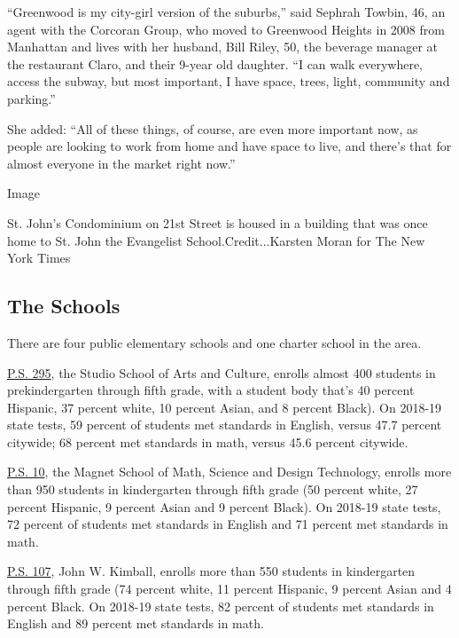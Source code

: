 ``Greenwood is my city-girl version of the suburbs,'' said Sephrah
Towbin, 46, an agent with the Corcoran Group, who moved to Greenwood
Heights in 2008 from Manhattan and lives with her husband, Bill Riley,
50, the beverage manager at the restaurant Claro, and their 9-year old
daughter. ``I can walk everywhere, access the subway, but most
important, I have space, trees, light, community and parking.''

She added: ``All of these things, of course, are even more important
now, as people are looking to work from home and have space to live, and
there's that for almost everyone in the market right now.''

Image

St. John's Condominium on 21st Street is housed in a building that was
once home to St. John the Evangelist School.Credit...Karsten Moran for
The New York Times

\hypertarget{the-schools}{%
\subsection{The Schools}\label{the-schools}}

There are four public elementary schools and one charter school in the
area.

\href{https://tools.nycenet.edu/snapshot/2019/15K295/EMS/}{P.S. 295},
the Studio School of Arts and Culture, enrolls almost 400 students in
prekindergarten through fifth grade, with a student body that's 40
percent Hispanic, 37 percent white, 10 percent Asian, and 8 percent
Black). On 2018-19 state tests, 59 percent of students met standards in
English, versus 47.7 percent citywide; 68 percent met standards in math,
versus 45.6 percent citywide.

\href{https://tools.nycenet.edu/snapshot/2019/15K010/EMS/}{P.S. 10}, the
Magnet School of Math, Science and Design Technology, enrolls more than
950 students in kindergarten through fifth grade (50 percent white, 27
percent Hispanic, 9 percent Asian and 9 percent Black). On 2018-19 state
tests, 72 percent of students met standards in English and 71 percent
met standards in math.

\href{https://tools.nycenet.edu/snapshot/2019/15K107/EMS/}{P.S. 107},
John W. Kimball, enrolls more than 550 students in kindergarten through
fifth grade (74 percent white, 11 percent Hispanic, 9 percent Asian and
4 percent Black. On 2018-19 state tests, 82 percent of students met
standards in English and 89 percent met standards in math.

